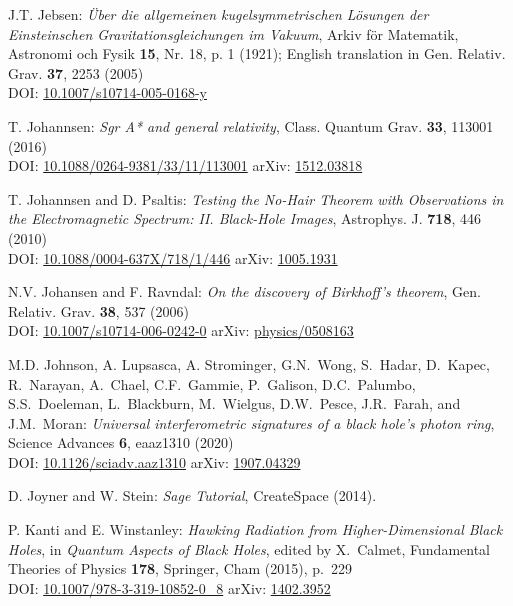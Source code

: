 \begin{thebibliography}{123}
J.T. Jebsen:
{\em Über die allgemeinen kugelsymmetrischen Lösungen der Einsteinschen
Gravitationsgleichungen im Vakuum},
Arkiv för Matematik, Astronomi och Fysik {\bf 15}, Nr. 18, p. 1 (1921);
English translation in
Gen. Relativ. Grav. {\bf 37}, 2253 (2005)\\
DOI: \href{https://doi.org/10.1007/s10714-005-0168-y}{10.1007/s10714-005-0168-y}

T. Johannsen:
{\em Sgr A* and general relativity},
Class. Quantum Grav.  {\bf 33}, 113001 (2016)\\
DOI: \href{https://doi.org/10.1088/0264-9381/33/11/113001}{10.1088/0264-9381/33/11/113001}\hfill
arXiv: \href{https://arxiv.org/abs/1512.03818}{1512.03818}

T. Johannsen and D. Psaltis:
{\em Testing the No-Hair Theorem with Observations in the Electromagnetic Spectrum: II. Black-Hole Images},
Astrophys. J. {\bf 718}, 446 (2010)\\
DOI: \href{https://doi.org/10.1088/0004-637X/718/1/446}{10.1088/0004-637X/718/1/446}\hfill
arXiv: \href{https://arxiv.org/abs/1005.1931}{1005.1931}

N.V. Johansen and F. Ravndal:
{\em On the discovery of Birkhoff's theorem},
Gen. Relativ. Grav. {\bf 38}, 537 (2006)\\
DOI: \href{https://doi.org/10.1007/s10714-006-0242-0}{10.1007/s10714-006-0242-0}\hfill
arXiv: \href{https://arxiv.org/abs/physics/0508163}{physics/0508163}

M.D. Johnson, A. Lupsasca, A. Strominger, G.N.~Wong, S.~Hadar, D.~Kapec, R.~Narayan, A.~Chael,
C.F.~Gammie, P.~Galison, D.C.~Palumbo, S.S.~Doeleman, L.~Blackburn, M.~Wielgus, D.W.~Pesce,
J.R.~Farah, and J.M.~Moran:
{\em Universal interferometric signatures of a black hole's photon ring},
Science Advances {\bf 6}, eaaz1310 (2020)\\
DOI: \href{https://doi.org/10.1126/sciadv.aaz1310}{10.1126/sciadv.aaz1310}\hfill
arXiv: \href{https://arxiv.org/abs/1907.04329}{1907.04329}

D. Joyner and W. Stein: {\em Sage Tutorial}, CreateSpace (2014).

P. Kanti and E. Winstanley: {\em Hawking Radiation from Higher-Dimensional Black Holes},
in {\em Quantum Aspects of Black Holes}, edited by X.~Calmet,
Fundamental Theories of Physics {\bf 178},
Springer, Cham (2015), p.~229\\
DOI: \href{https://doi.org/10.1007/978-3-319-10852-0_8}{10.1007/978-3-319-10852-0\_8}\hfill
arXiv: \href{https://arxiv.org/abs/1402.3952}{1402.3952}


\end{thebibliography}
